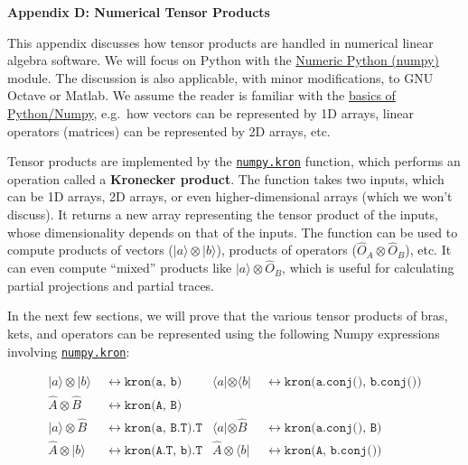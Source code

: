 \documentclass[pra,12pt]{revtex4}
\begin{document}
\begin{center}
{\large \textbf{Appendix D: Numerical Tensor Products}}
\end{center}

\noindent
This appendix discusses how tensor products are handled in numerical
linear algebra software.  We will focus on Python with the
\href{https://numpy.org/}{Numeric Python (numpy)} module.  The
discussion is also applicable, with minor modifications, to GNU Octave
or Matlab.  We assume the reader is familiar with the
\href{https://docs.scipy.org/doc/numpy/user/quickstart.html}{basics of
  Python/Numpy}, e.g.~how vectors can be represented by 1D arrays,
linear operators (matrices) can be represented by 2D arrays, etc.

Tensor products are implemented by the
\href{https://docs.scipy.org/doc/numpy/reference/generated/numpy.kron.html}{\texttt{numpy.kron}}
function, which performs an operation called a \textbf{Kronecker
  product}.  The function takes two inputs, which can be 1D arrays, 2D
arrays, or even higher-dimensional arrays (which we won't discuss).
It returns a new array representing the tensor product of the inputs,
whose dimensionality depends on that of the inputs.  The function can
be used to compute products of vectors ($|a\rangle\otimes|b\rangle$),
products of operators ($\hat{O}_A\otimes \hat{O}_B$), etc.  It can
even compute ``mixed'' products like $|a\rangle\otimes\hat{O}_B$,
which is useful for calculating partial projections and partial
traces.

In the next few sections, we will prove that the various tensor
products of bras, kets, and operators can be represented using the
following Numpy expressions involving
\href{https://docs.scipy.org/doc/numpy/reference/generated/numpy.kron.html}{\texttt{numpy.kron}}:
\begin{framed}
  \begin{align*}
    |a\rangle\otimes|b\rangle &\;\;\leftrightarrow\;
    \texttt{kron(a, b)} &
    \langle a | \otimes \langle b| &\;\;\leftrightarrow\;
    \texttt{kron(a.conj(), b.conj())} \\
    \hat{A}\otimes\hat{B} &\;\;\leftrightarrow\;
    \texttt{kron(A, B)} \\
    |a\rangle \otimes \hat{B} &\;\;\leftrightarrow\;
    \texttt{kron(a, B.T).T} &
    \langle a| \otimes \hat{B} &\;\;\leftrightarrow\;
    \texttt{kron(a.conj(), B)} \\
    \hat{A} \otimes | b\rangle &\;\;\leftrightarrow\;
    \texttt{kron(A.T, b).T} &
    \hat{A} \otimes \langle b| &\;\;\leftrightarrow\;
    \texttt{kron(A, b.conj())}
  \end{align*}
\end{framed}
\end{document}
